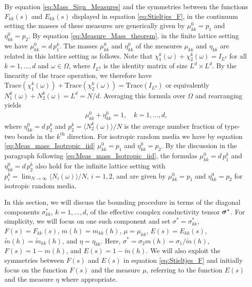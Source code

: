 \documentclass{cmslatex}
\newcommand\bsig{\mbox{\boldmath${\sigma}$}}
\begin{document}
By equation \eqref{eq:Mass_Sign_Measures} and
the symmetries between the functions $F_{kk}(s)$ and $E_{kk}(s)$
displayed in equation \eqref{eq:Stieltjes_F}, in the continuum setting
the masses of these measures are generically given by $\mu_{kk}^0=p_1$
and $\eta_{kk}^0=p_2$. By equation \eqref{eq:Measure_Mass_theorem}, in
the finite lattice setting we have $\mu_{kk}^0=d\,p_1^k$. The masses
$\mu_{kk}^0$ and $\eta_{kk}^0$ of the measures $\mu_{kk}$ and $\eta_{kk}$ are
related in this lattice setting as follows. Note that
$\chi_1^k(\omega)+\chi_2^k(\omega)=I_{L^d}$ for all $k=1,\ldots,d$ and $\omega\in\Omega$, where
$I_{L^d}$ is the identity matrix of size $L^d\times L^d$. By the linearity
of the trace operation, we therefore have
$\text{Trace}(\chi_1^k(\omega))+\text{Trace}(\chi_2^k(\omega))=\text{Trace}(I_{L^d})$    
or equivalently $N_1^k(\omega)+N_2^k(\omega)=L^d=N/d$. Averaging this formula
over $\Omega$ and rearranging yields
%
\begin{align}\label{eq:Measure_Masses_Lattice}
  \mu_{kk}^0+\eta_{kk}^0=1, \quad  k=1,\ldots,d,
\end{align}
%
where $\eta_{kk}^0=d\,p_2^k$ and $p_2^k=\langle N_2^k(\omega)\rangle/N$ is the average
number fraction of type-two bonds in the $k^{\text{th}}$
direction. For isotropic random media we have by equation
\eqref{eq:Meas_mass_Isotropic_iid} $\mu_{kk}^0=p_1$ and $\eta_{kk}^0=p_2$. By
the discussion in the paragraph following
\eqref{eq:Meas_mass_Isotropic_iid}, the formulas $\mu_{kk}^0=d\,p_1^k$
and $\eta_{kk}^0=d\,p_2^k$ also hold for the infinite lattice setting
with $p_i^k=\lim_{N\to\infty}\langle N_i(\omega)\rangle/N$, $i=1,2$, and are given by
$\mu_{kk}^0=p_1$ and $\eta_{kk}^0=p_2$ for isotropic random media.  


 
In this section, we will discuss the bounding procedure in terms of
the diagonal components $\sigma^*_{kk}$, $k=1,\ldots,d$, of the effective
complex conductivity tensor $\bsig^*$. For
simplicity, we will focus on one such component and set
$\sigma^*=\sigma_{kk}^*$, $F(s)=F_{kk}(s)$, $m(h)=m_{kk}(h)$, $\mu=\mu_{kk}$,
$E(s)=E_{kk}(s)$, $\tilde{m}(h)=\tilde{m}_{kk}(h)$, and
$\eta=\eta_{kk}$. Here, $\sigma^*=\sigma_2m(h)=\sigma_1/\tilde{m}(h)$, $F(s)=1-m(h)$, and
$E(s)=1-\tilde{m}(h)$. We will also exploit the symmetries between
$F(s)$ and $E(s)$ in equation \eqref{eq:Stieltjes_F} and initially
focus on the function $F(s)$ and the measure $\mu$, referring to the
function $E(s)$ and the measure $\eta$ where appropriate.
\end{document}

